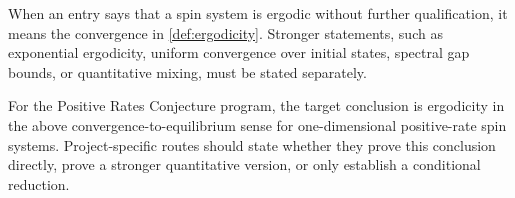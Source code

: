 \begin{conv}\label{conv:ergodicity-wiki}
When an entry says that a spin system is ergodic without further qualification, it means the convergence in \cref{def:ergodicity}. Stronger statements, such as exponential ergodicity, uniform convergence over initial states, spectral gap bounds, or quantitative mixing, must be stated separately.
\end{conv}

\begin{rem}\label{rem:ergodicity-prc}
For the Positive Rates Conjecture program, the target conclusion is ergodicity in the above convergence-to-equilibrium sense for one-dimensional positive-rate spin systems. Project-specific routes should state whether they prove this conclusion directly, prove a stronger quantitative version, or only establish a conditional reduction.
\end{rem}
